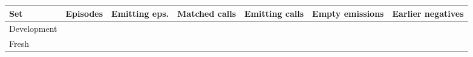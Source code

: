 \begin{tabular}{lrrrrrr}
\toprule
Set & Episodes & Emitting eps. & Matched calls & Emitting calls & Empty emissions & Earlier negatives \\
\midrule
Development & \gptossCoverageDevelopmentEpisodes{} & \gptossCoverageDevelopmentEmittingEpisodes{} & \gptossCoverageDevelopmentMatchedCalls{} & \gptossCoverageDevelopmentEmittingCalls{} & \gptossCoverageDevelopmentEmptyEmissions{} & \gptossCoverageDevelopmentRetainedEarlierNegatives{} \\
Fresh & \gptossCoverageFreshEpisodes{} & \gptossCoverageFreshEmittingEpisodes{} & \gptossCoverageFreshMatchedCalls{} & \gptossCoverageFreshEmittingCalls{} & \gptossCoverageFreshEmptyEmissions{} & \gptossCoverageFreshRetainedEarlierNegatives{} \\
\bottomrule
\end{tabular}
